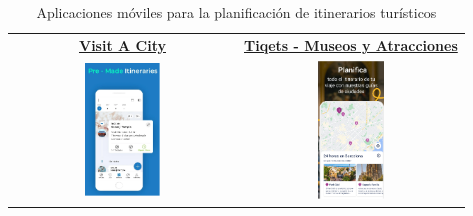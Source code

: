 \begin{table}[h!]
\begin{tabular}{cc}
	\hline
	\href{https://play.google.com/store/apps/details?id=com.visitacity}{\textbf{Visit A City}} & \href{https://play.google.com/store/apps/details?id=com.tiqets.tiqetsapp}{\textbf{Tiqets - Museos y Atracciones}} \\
	\includegraphics[width=0.35\textwidth]{img/visit_a_city.png} & \includegraphics[width=0.31\textwidth]{img/tiquets.png} \\
	\hline
	\end{tabular}
	\caption{Aplicaciones móviles para la planificación de itinerarios turísticos}
	\label{fig:apps_similares}
	\end{table}

\newpage

